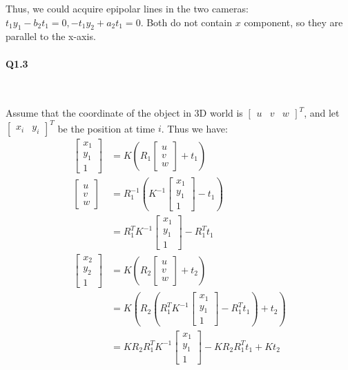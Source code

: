 \documentclass[11pt]{article} \usepackage{fullpage} \usepackage{graphicx} \usepackage{epstopdf} \usepackage{color} \usepackage{psfrag} \usepackage{pdfsync}\usepackage{indentfirst}\usepackage{subfigure}\usepackage{float}\usepackage[section]{placeins}
\begin{document}
Thus, we could acquire epipolar lines in the two cameras: $t_1y_1 - b_2t_1 = 0, -t_1y_2 + a_2t_1 = 0$. Both do not contain $x$ component, so they are parallel to the x-axis.

\paragraph{Q1.3}~{}

Assume that the coordinate of the object in 3D world is $\begin{bmatrix} u & v & w\end{bmatrix}^T$, and let $\begin{bmatrix} x_i & y_i \end{bmatrix}^T$ be the position at time $i$. Thus we have:
\begin{align}
	\begin{bmatrix} x_1 \\ y_1 \\ 1 \end{bmatrix} & = K\left(R_1\begin{bmatrix}u \\ v \\ w\end{bmatrix} + t_1\right) \\
	\begin{bmatrix} u \\ v \\ w \end{bmatrix} & = R_1^{-1}\left(K^{-1}\begin{bmatrix}x_1 \\ y_1 \\ 1\end{bmatrix} - t_1\right) \\
	& = R_1^{T}K^{-1}\begin{bmatrix}x_1 \\ y_1 \\ 1\end{bmatrix} - R_1^{T}t_1 \\
	\begin{bmatrix} x_2 \\ y_2 \\ 1 \end{bmatrix} & = K\left(R_2\begin{bmatrix}u \\ v \\ w\end{bmatrix} + t_2\right) \\
	& = K\left(R_2\left(R_1^{T}K^{-1}\begin{bmatrix}x_1 \\ y_1 \\ 1\end{bmatrix} - R_1^{T}t_1\right) + t_2\right) \\
	& = KR_2R_1^{T}K^{-1}\begin{bmatrix}x_1 \\ y_1 \\ 1\end{bmatrix} - KR_2R_1^{T}t_1 + Kt_2
\end{align}
\end{document}
